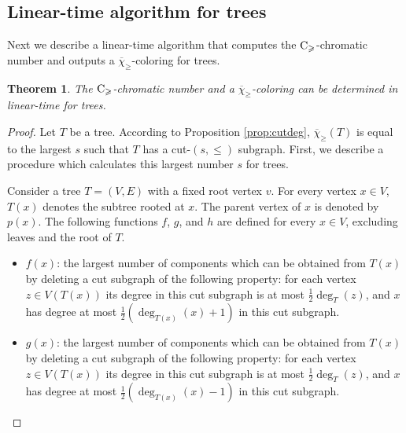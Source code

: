 \documentclass{article}
\newtheorem{theorem}{Theorem}
\theoremstyle{definition}
\newcommand{\mc}{\overline{\chi}_{\geqslant}}
\newcommand{\cg}{{\rm C}_{\geqslant}}
\begin{document}
\subsection{Linear-time algorithm for trees}\label{sec:tree}
Next we describe a linear-time algorithm that computes the $\cg$-chromatic number and outputs a $\mc$-coloring for trees.

\begin{theorem}
    The $\cg$-chromatic number and a $\mc$-coloring can be determined in linear-time for trees. 
\end{theorem}
\begin{proof}
     Let $T$ be a tree. According to Proposition \ref{prop:cutdeg}, $\mc(T)$ is equal to the largest  $s$ such that $T$ has a cut-$(s,\leqslant)$ subgraph. First, we describe a procedure
 which calculates this largest number $s$ for trees. 
 
Consider a tree $T = (V,E)$ with a fixed root vertex $v$. For every vertex $x \in V$, $T(x)$  denotes the subtree rooted at $x$.  The parent vertex of $x$ is denoted by $p(x)$.   
The following functions $f$, $g$, and $h$ are defined for every $x \in V$, excluding leaves and the root of $T$. 

 \begin{itemize}
     \item $f(x)$: the largest number of components which can be obtained from $T(x)$ by deleting a cut subgraph of the following property: for each vertex $z \in V(T(x))$ its degree in this cut subgraph is at most $ \frac{1}{2}\deg_{T}(z)$, and $x$ has degree at most $\frac{1}{2}(\deg_{T(x)}(x)+1)$ in this cut subgraph. 


\item $g(x)$: the largest number of components which can be obtained from $T(x)$ by deleting a cut subgraph of the following property: for each vertex $z \in V(T(x))$ its degree in this cut subgraph is at most $ \frac{1}{2}\deg_{T}(z) $, and $x$ has degree at most $\frac{1}{2}(\deg_{T(x)}(x)-1)$ in this cut subgraph. 



\end{itemize}
\end{proof}
\end{document}
